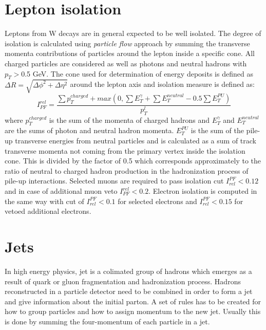 \section{Lepton isolation}
Leptons from W decays are in general expected to be well isolated. The degree of isolation is calculated using \textit{particle flow} approach by summing the transverse momenta contributions of particles around the lepton inside a specific cone. All charged particles are considered as well as photons and neutral hadrons with $p_T>$0.5 GeV. The cone used for determination of energy deposits is defined as $\Delta R = \sqrt{\Delta \phi^2+ \Delta \eta^2}$ around the lepton axis and isolation measure is defined as:
\begin{equation}
I_{PF}^{rel} = \frac{\sum p_T^{charged} + max(0, \sum E_T^{\gamma}+\sum E_T^{neutral}-0.5\sum E_T^{PU})}{p_T^l}
\end{equation}
where $p_T^{charged}$ is the sum of the momenta of charged hadrons and $E_T^{\gamma} $ and $E_T^{neutral}$ are the sums of photon and neutral hadron momenta. $E_T^{PU}$ is the sum of the pile-up transverse energies from neutral particles and is calculated as a sum of track transverse momenta not coming from the primary vertex inside the isolation cone. This is divided by the factor of 0.5 which corresponds approximately to the ratio of neutral to charged hadron production in the hadronization process of pile-up interactions. Selected muons are required to pass isolation cut $I_{rel}^{PF}<0.12$ and in case of additional muon veto $I_{PF}^{rel}<0.2$. Electron isolation is computed in the same way with cut of $I_{rel}^{PF}<0.1$ for selected electrons and $I_{rel}^{PF}<0.15$ for vetoed additional electrons.



\section{Jets}

In high energy physics, jet is a colimated group of hadrons which emerges as a result of quark or gluon fragmentation and hadronization process. Hadrons reconstructed in a particle detector need to be combined in order to form a jet and give information about the initial parton. A set of rules has to be created for how to group particles and how to assign momentum to the new jet. Usually this is done by summing the four-momentum of each particle in a jet.

